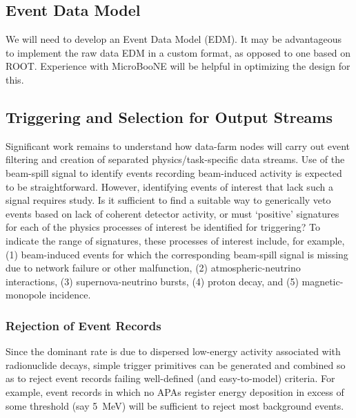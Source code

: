 \subsection{Event Data Model}

We will need to develop an Event Data Model (EDM).  It may be advantageous 
to implement the raw data EDM in a custom format, as opposed to one based on 
ROOT.  Experience with MicroBooNE will be helpful in optimizing the design 
for this.

\subsection{Triggering and Selection for Output Streams}

Significant work remains to understand how data-farm nodes will carry out 
event filtering and creation of separated physics/task-specific data 
streams.  
Use of the \LBNE beam-spill signal to identify events recording 
beam-induced activity is expected to be straightforward.  However, 
identifying events of interest that lack such a signal requires study.  
Is it sufficient to find a suitable way to generically veto events based 
on lack of coherent detector activity, or must `positive' signatures for 
each of the physics processes of interest be identified for triggering?  
To indicate the range of signatures, 
these processes of interest include, for example, (1) beam-induced events 
for which the corresponding beam-spill signal is missing due to 
network failure or other malfunction, (2) atmospheric-neutrino interactions, 
(3) supernova-neutrino bursts, (4) proton decay, and (5) magnetic-monopole 
incidence.  

\subsubsection{Rejection of Event Records}

Since the dominant rate is due to dispersed low-energy activity 
associated with radionuclide decays, simple trigger primitives can be 
generated and combined so as to reject event records failing well-defined 
(and easy-to-model) criteria.  
For example, event records in which no APAs 
register energy deposition in excess of some threshold (say 5~MeV) 
will be sufficient to reject most background events.

